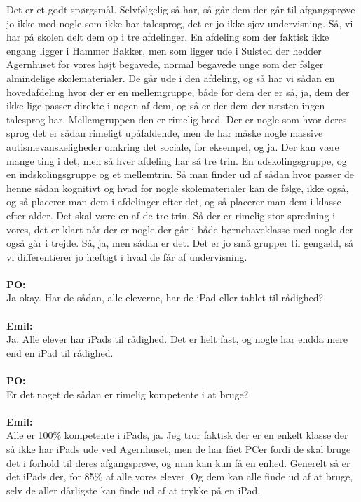Det er et godt spørgsmål.
Selvfølgelig så har, så går dem der går til afgangsprøve jo ikke med nogle som ikke har talesprog, det er jo ikke sjov undervisning.
Så, vi har på skolen delt dem op i tre afdelinger.
En afdeling som der faktisk ikke engang ligger i Hammer Bakker, men som ligger ude i Sulsted der hedder Agernhuset for vores højt begavede, normal begavede unge som der følger almindelige skolematerialer.
De går ude i den afdeling, og så har vi sådan en hovedafdeling hvor der er en mellemgruppe, både for dem der er så, ja, dem der ikke lige passer direkte i nogen af dem, og så er der dem der næsten ingen talesprog har.
Mellemgruppen den er rimelig bred. 
Der er nogle som hvor deres sprog det er sådan rimeligt upåfaldende, men de har måske nogle massive autismevanskeligheder omkring det sociale, for eksempel, og ja.
Der kan være mange ting i det, men så hver afdeling har så tre trin.
En udskolingsgruppe, og en indskolingsgruppe og et mellemtrin. 
Så man finder ud af sådan hvor passer de henne sådan kognitivt og hvad for nogle skolematerialer kan de følge, ikke også, og så placerer man dem i afdelinger efter det, og så placerer man dem i klasse efter alder.
Det skal være en af de tre trin. 
Så der er rimelig stor spredning i vores, det er klart når der er nogle der går i både børnehaveklasse med nogle der også går i trejde.
Så, ja, men sådan er det.
Det er jo små grupper til gengæld, så vi differentierer jo hæftigt i hvad de får af undervisning.
\\\\
\textbf{PO:}\\
Ja okay.
Har de sådan, alle eleverne, har de iPad eller tablet til rådighed?
\\\\
\textbf{Emil:}\\
Ja.
Alle elever har iPads til rådighed. 
Det er helt fast, og nogle har endda mere end en iPad til rådighed.
\\\\
\textbf{PO:}\\
Er det noget de sådan er rimelig kompetente i at bruge?
\\\\
\textbf{Emil:} \\
Alle er 100\% kompetente i iPads, ja.
Jeg tror faktisk der er en enkelt klasse der så ikke har iPads ude ved Agernhuset, men de har fået PCer fordi de skal bruge det i forhold til deres afgangsprøve, og man kan kun få en enhed.
Generelt så er det iPads der, for 85\% af alle vores elever. 
Og dem kan alle finde ud af at bruge, selv de aller dårligste kan finde ud af at trykke på en iPad.
